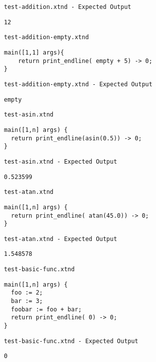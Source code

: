 \medskip \noindent \texttt{test-addition.xtnd - Expected Output}


\begin{lstlisting}
12
\end{lstlisting}


\medskip \noindent \texttt{test-addition-empty.xtnd}


\begin{lstlisting}
main([1,1] args){
	return print_endline( empty + 5) -> 0;
}
\end{lstlisting}


\medskip \noindent \texttt{test-addition-empty.xtnd - Expected Output}


\begin{lstlisting}
empty
\end{lstlisting}


\medskip \noindent \texttt{test-asin.xtnd}


\begin{lstlisting}
main([1,n] args) {
  return print_endline(asin(0.5)) -> 0;
}
\end{lstlisting}


\medskip \noindent \texttt{test-asin.xtnd - Expected Output}


\begin{lstlisting}
0.523599
\end{lstlisting}


\medskip \noindent \texttt{test-atan.xtnd}


\begin{lstlisting}
main([1,n] args) {
  return print_endline( atan(45.0)) -> 0;
}
\end{lstlisting}


\medskip \noindent \texttt{test-atan.xtnd - Expected Output}


\begin{lstlisting}
1.548578
\end{lstlisting}


\medskip \noindent \texttt{test-basic-func.xtnd}


\begin{lstlisting}
main([1,n] args) {
  foo := 2;
  bar := 3;
  foobar := foo + bar;
  return print_endline( 0) -> 0;
}
\end{lstlisting}


\medskip \noindent \texttt{test-basic-func.xtnd - Expected Output}


\begin{lstlisting}
0
\end{lstlisting}


